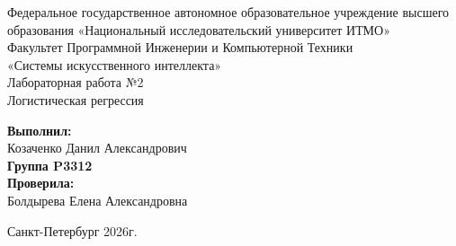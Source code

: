 \begin{titlepage}
    \centering
    Федеральное государственное автономное образовательное учреждение высшего образования «Национальный исследовательский университет ИТМО» \\
    \vspace{1cm}
    Факультет Программной Инженерии и Компьютерной Техники \\
    \vfill
    {\large «Системы искусственного интеллекта»} \\
    \vspace{0.5cm}
    Лабораторная работа №2 \\
    Логистическая регрессия \\
    \vfill
    \vspace{\fill}
    \begin{flushright}
        \textbf{Выполнил:} \\
        Козаченко Данил Александрович \\
        \textbf{Группа P3312} \\
        \textbf{Проверила:} \\
        Болдырева Елена Александровна
    \end{flushright}
    \vspace{2cm}
    Санкт-Петербург
    2026г.
\end{titlepage}
